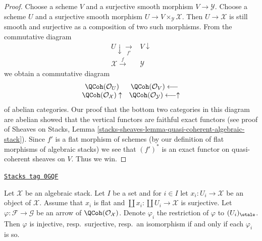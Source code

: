 \begin{proof}
Choose a scheme $V$ and a surjective smooth morphism $V \to \mathcal{Y}$.
Choose a scheme $U$ and a surjective smooth morphism
$U \to V \times_\mathcal{Y} \mathcal{X}$. Then $U \to \mathcal{X}$ is
still smooth and surjective as a composition of two such morphisms.
From the commutative diagram
$$
\begin{array}{cc}U \downarrow\underset{f'}{\longrightarrow} & V \downarrow \\ \mathcal{X} \overset{f}{\longrightarrow} & \mathcal{Y}\end{array}
$$
we obtain a commutative diagram
$$
\begin{array}{cc}\QCoh(\mathcal{O}_U) & \QCoh(\mathcal{O}_V) \longleftarrow \\ \QCoh(\mathcal{O}_\mathcal{X}) \uparrow & \QCoh(\mathcal{O}_\mathcal{Y}) \longleftarrow\uparrow\end{array}
$$
of abelian categories. Our proof that the bottom two categories in this
diagram are abelian showed that the vertical functors are faithful
exact functors (see proof of
Sheaves on Stacks, Lemma
\ref{stacks-sheaves-lemma-quasi-coherent-algebraic-stack}).
Since $f'$ is a flat morphism of schemes (by our definition of
flat morphisms of algebraic stacks) we see that $(f')^*$ is an
exact functor on quasi-coherent sheaves on $V$. Thus we win.
\end{proof}

\begin{lemma}
\label{stacks-cohomology-lemma-quasi-coherent-check-exact}
\href{https://stacks.math.columbia.edu/tag/0GQF}{\texttt{Stacks tag 0GQF}}

Let $\mathcal{X}$ be an algebraic stack. Let $I$ be a set and
for $i \in I$ let $x_i : U_i \to \mathcal{X}$ be an object
of $\mathcal{X}$. Assume that $x_i$ is flat and
$\coprod x_i : \coprod U_i \to \mathcal{X}$ is surjective.
Let $\varphi : \mathcal{F} \to \mathcal{G}$ be an arrow of
$\QCoh(\mathcal{O}_\mathcal{X})$. Denote $\varphi_i$
the restriction of $\varphi$ to $(U_i)_\etale$.
Then $\varphi$ is injective, resp.\ surjective, resp.\ an isomorphism
if and only if each $\varphi_i$ is so.
\end{lemma}

